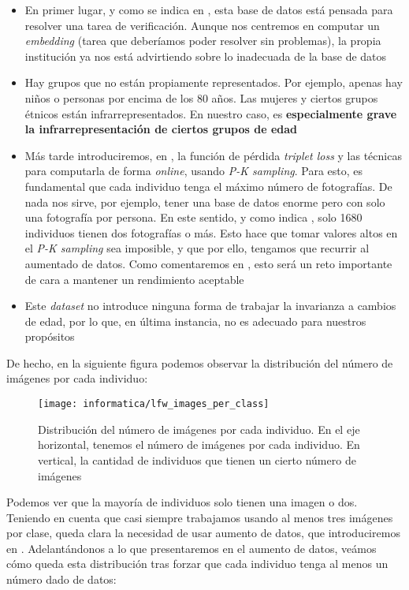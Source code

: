 \begin{itemize}
    \item En primer lugar, y como se indica en \cite{informatica:lfw_dataset}, esta base de datos está pensada para resolver una tarea de verificación. Aunque nos centremos en computar un \textit{embedding} (tarea que deberíamos poder resolver sin problemas), la propia institución ya nos está advirtiendo sobre lo inadecuada de la base de datos
    \item Hay grupos que no están propiamente representados. Por ejemplo, apenas hay niños o personas por encima de los 80 años. Las mujeres y ciertos grupos étnicos están infrarrepresentados. En nuestro caso, es \textbf{especialmente grave la infrarrepresentación de ciertos grupos de edad}
    \item Más tarde introduciremos, en , la función de pérdida \textit{triplet loss} y las técnicas para computarla de forma \textit{online}, usando \textit{P-K sampling}. Para esto, es fundamental que cada individuo tenga el máximo número de fotografías. De nada nos sirve, por ejemplo, tener una base de datos enorme pero con solo una fotografía por persona. En este sentido, y como indica \cite{informatica:lfw_dataset}, solo 1680 individuos tienen dos fotografías o más. Esto hace que tomar valores altos en el \textit{P-K sampling} sea imposible, y que por ello, tengamos que recurrir al aumentado de datos. Como comentaremos en , esto será un reto importante de cara a mantener un rendimiento aceptable
    \item Este \textit{dataset} no introduce ninguna forma de trabajar la invarianza a cambios de edad, por lo que, en última instancia, no es adecuado para nuestros propósitos
\end{itemize}

De hecho, en la siguiente figura podemos observar la distribución del número de imágenes por cada individuo:

\begin{figure}[H]
    \centering
    \texttt{[image: informatica/lfw\_images\_per\_class]}
    \caption{Distribución del número de imágenes por cada individuo. En el eje horizontal, tenemos el número de imágenes por cada individuo. En vertical, la cantidad de individuos que tienen un cierto número de imágenes}
\end{figure}

Podemos ver que la mayoría de individuos solo tienen una imagen o dos. Teniendo en cuenta que casi siempre trabajamos usando al menos tres imágenes por clase, queda clara la necesidad de usar aumento de datos, que introduciremos en . Adelantándonos a lo que presentaremos en el aumento de datos, veámos cómo queda esta distribución tras forzar que cada individuo tenga al menos un número dado de datos:

